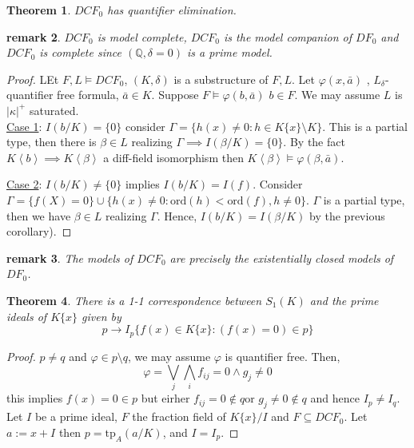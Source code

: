 \documentclass[letterpaper, 12pt]{article}
\newcommand{\fin}{\qquad \quad \hfill \framebox[1.75mm][l]{\,}}
\newcommand{\bQ}{\mathbb{Q}}
\newcommand{\tp}{\mbox{tp}}
\providecommand{\ip}[1]{\left\langle #1 \right\rangle}
\newcommand{\ord}{\mbox{ord}}
\theoremstyle{stdthm}
\newtheorem{thm}{Theorem}[section]
\theoremstyle{stddef}
\newtheorem{rem}[thm]{remark} %
\theoremstyle{stdnonum}
\theoremstyle{stdqands}
\theoremstyle{stdbold}
\begin{document}
\begin{thm}
 $DCF_0$ has quantifier elimination. 
\end{thm}

\begin{rem}
$DCF_0$ is model complete, $DCF_0$ is the model companion of $DF_0$ and $DCF_0$ is complete since $(\bQ,\delta =0)$ is a prime model. 
\end{rem}

\begin{proof}
LEt $F, L \models DCF_0$, $(K,\delta) $ is a substructure of $F,L$. Let $\varphi(x,\bar{a})$ , $L_\delta$-quantifier free formula, $\bar{a} \in K$. Suppose $F \models \varphi(b,\bar{a})$ $b \in F$. We may assume $L$ is $|\kappa|^+$ saturated. \\

\underline{Case 1}: $I(b/K) = \{0\}$ consider $\Gamma =\{ h(x) \neq 0 : h \in K\{x\} \setminus K\}$. This is a partial type, then there is $\beta \in L$ realizing $\Gamma \implies I(\beta/K) = \{0\}$. By the fact $K\ip{b} \implies K\ip{\beta}$ a diff-field isomorphism then $K\ip{\beta} \models\varphi(\beta, \bar{a})$. 

\underline{Case 2}: $I(b/K) \neq \{0\}$ implies $I(b/K) = I(f)$. Consider $\Gamma = \{f(X) = 0\} \cup \{h(x) \neq 0: \ord(h) < \ord(f), h\neq 0 \}$. $\Gamma$ is a partial type, then we have $\beta \in L$ realizing $\Gamma$. Hence, $I(b/K) = I(\beta/K)$ by the previous corollary). 
\end{proof}

\begin{rem}
The models of $DCF_0$ are precisely the existentially closed models of $DF_0$. 
\end{rem}

\begin{thm}
There is a 1-1 correspondence between $S_1(K)$ and the prime ideals of $K\{x\}$ given by 
\[ p \to I_p \{f(x) \in K\{x\} : (f(x) = 0) \in p \} \]

\end{thm}

\begin{proof}
$p \neq q$ and $\varphi \in p \setminus q$, we may assume $\varphi$ is quantifier free. Then, 
\[ \varphi = \bigvee_j \bigwedge_i f_{ij} = 0 \wedge g_j \neq 0 \]
this implies $f(x) = 0 \in p$ but eirher $f_{ij} = 0 \notin q$or $g_j \neq 0 \notin q$ and hence $I_p \neq I_q$. \\

Let $I$ be a prime ideal, $F$ the fraction field of $K\{x\}/I$ and $F \subseteq DCF_0$. Let $a := x + I$ then $p = \tp_A(a/K)$, and $I = I_p$. 
\end{proof}
\end{document}

